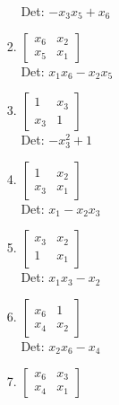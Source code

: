\documentclass[12pt]{article}
\begin{document}
\begin{enumerate}
\begin{enumerate}
\begin{enumerate}
Det: $- x_{3} x_{5} + x_{6}$\\


\item $\displaystyle \left[\begin{matrix}x_{6} & x_{2}\\x_{5} & x_{1}\end{matrix}\right]$\\

Det: $x_{1} x_{6} - x_{2} x_{5}$\\


\item $\displaystyle \left[\begin{matrix}1 & x_{3}\\x_{3} & 1\end{matrix}\right]$\\

Det: $- x_{3}^{2} + 1$\\


\item $\displaystyle \left[\begin{matrix}1 & x_{2}\\x_{3} & x_{1}\end{matrix}\right]$\\

Det: $x_{1} - x_{2} x_{3}$\\


\item $\displaystyle \left[\begin{matrix}x_{3} & x_{2}\\1 & x_{1}\end{matrix}\right]$\\

Det: $x_{1} x_{3} - x_{2}$\\


\item $\displaystyle \left[\begin{matrix}x_{6} & 1\\x_{4} & x_{2}\end{matrix}\right]$\\

Det: $x_{2} x_{6} - x_{4}$\\


\item $\displaystyle \left[\begin{matrix}x_{6} & x_{3}\\x_{4} & x_{1}\end{matrix}\right]$\\


\end{enumerate}
\end{enumerate}
\end{enumerate}
\end{document}
